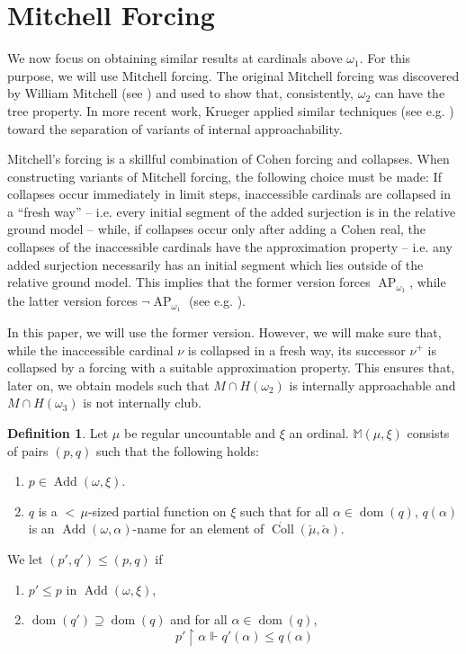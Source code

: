 \documentclass[a4paper]{amsart}
\theoremstyle{definition}
\newtheorem{mydef}{Definition}[section]
\theoremstyle{remark}
\theoremstyle{plain}
\numberwithin{mydef}{section}
\DeclareMathOperator{\dom}{dom}
\DeclareMathOperator{\Add}{Add}
\DeclareMathOperator{\AP}{AP}
\DeclareMathOperator{\Coll}{Coll}
\newcommand{\dM}{\mathbb{M}}
\newcommand{\uhr}{\upharpoonright}
\begin{document}
	\section{Mitchell Forcing}
	
	We now focus on obtaining similar results at cardinals above $\omega_1$. For this purpose, we will use Mitchell forcing. The original Mitchell forcing was discovered by William Mitchell (see \cite{MitchellTreeProp}) and used to show that, consistently, $\omega_2$ can have the tree property. In more recent work, Krueger applied similar techniques (see e.g. \cite{KruegerMitchellStyle}) toward the separation of variants of internal approachability.
	
	Mitchell's forcing is a skillful combination of Cohen forcing and collapses. When constructing variants of Mitchell forcing, the following choice must be made: If collapses occur immediately in limit steps, inaccessible cardinals are collapsed in a ``fresh way'' -- i.e. every initial segment of the added surjection is in the relative ground model -- while, if collapses occur only after adding a Cohen real, the collapses of the inaccessible cardinals have the approximation property -- i.e. any added surjection necessarily has an initial segment which lies outside of the relative ground model. This implies that the former version forces $\AP_{\omega_1}$, while the latter version forces $\neg\AP_{\omega_1}$ (see e.g. \cite{CummingsFriedmanMagidorRinotSinapovaEightfold}).
	
	In this paper, we will use the former version. However, we will make sure that, while the inaccessible cardinal $\nu$ is collapsed in a fresh way, its successor $\nu^+$ is collapsed by a forcing with a suitable approximation property. This ensures that, later on, we obtain models such that $M\cap H(\omega_2)$ is internally approachable and $M\cap H(\omega_3)$ is not internally club.
	
	\begin{mydef}
		Let $\mu$ be regular uncountable and $\xi$ an ordinal. $\dM(\mu,\xi)$ consists of pairs $(p,q)$ such that the following holds:
		\begin{enumerate}
			\item $p\in\Add(\omega,\xi)$.
			\item $q$ is a ${<}\,\mu$-sized partial function on $\xi$ such that for all $\alpha\in\dom(q)$, $q(\alpha)$ is an $\Add(\omega,\alpha)$-name for an element of $\dot{\Coll}(\check{\mu},\check{\alpha})$.
		\end{enumerate}
		We let $(p',q')\leq(p,q)$ if
		\begin{enumerate}
			\item $p'\leq p$ in $\Add(\omega,\xi)$,
			\item $\dom(q')\supseteq\dom(q)$ and for all $\alpha\in\dom(q)$,
			$$p'\uhr\alpha\Vdash q'(\alpha)\leq q(\alpha)$$
		\end{enumerate}
	\end{mydef}
	
\end{document}

